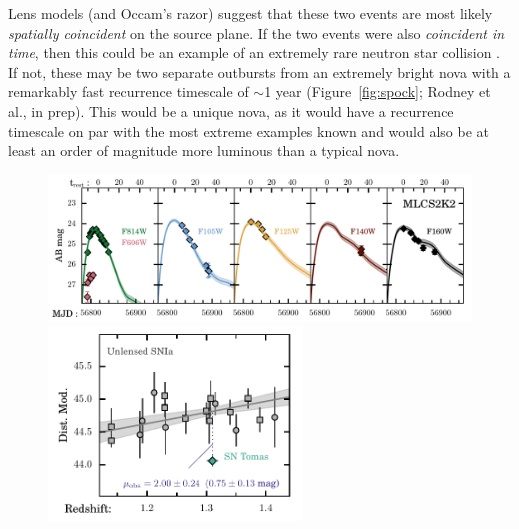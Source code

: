 \documentclass[12pt]{article}
\begin{document}
Lens models (and Occam's razor) suggest that these two events are most
likely {\it spatially coincident} on the source plane.  If the two
events were also {\it coincident in time}, then this could be an
example of an extremely rare neutron star collision \citep[a
  ``kilonova'';][]{Li:1998,Tanvir:2013,Kasen:2014,Metzger:2015}.  If not,
these may be two separate outbursts from an extremely bright nova with
a remarkably fast recurrence timescale of $\sim$1 year
(Figure~\ref{fig:spock}; Rodney et al., in prep).  This would be a
unique nova, as it would have a recurrence timescale on par with the
most extreme examples known \citep{Tang:2014} and would also be at
least an order of magnitude more luminous than a typical nova.


\begin{figure}
\centering
  \includegraphics[width=\textwidth]{FIG/snTomas_lightcurve_fit_magAB.pdf} \\
  \includegraphics[width=0.6\textwidth]{FIG/snTomas_hubble_diagram.pdf}

\end{figure}
\end{document}
